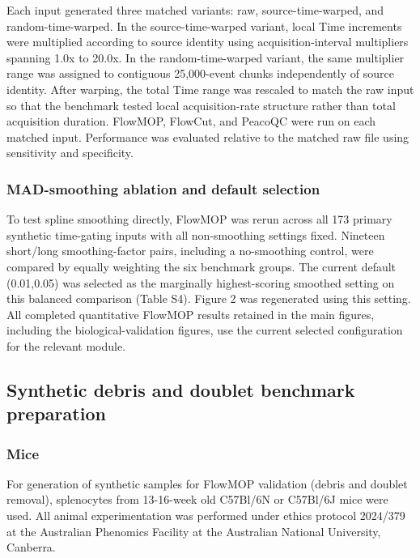 \documentclass[ASNA]{latex/wiley/USG}
\begin{document}
Each input generated three matched variants: raw, source-time-warped,
and random-time-warped. In the source-time-warped variant, local Time
increments were multiplied according to source identity using
acquisition-interval multipliers spanning 1.0x to 20.0x. In the
random-time-warped variant, the same multiplier range was assigned to
contiguous 25,000-event chunks independently of source identity. After
warping, the total Time range was rescaled to match the raw input so
that the benchmark tested local acquisition-rate structure rather than
total acquisition duration. FlowMOP, FlowCut, and PeacoQC were run on
each matched input. Performance was evaluated relative to the matched
raw file using sensitivity and specificity.

\subsubsection{MAD-smoothing ablation and default
selection}\label{mad-smoothing-ablation-and-default-selection}

To test spline smoothing directly, FlowMOP was rerun across all 173
primary synthetic time-gating inputs with all non-smoothing settings
fixed. Nineteen short/long smoothing-factor pairs, including a
no-smoothing control, were compared by equally weighting the six
benchmark groups. The current default (0.01,0.05) was selected as the
marginally highest-scoring smoothed setting on this balanced comparison
(Table S4). Figure 2 was regenerated using this setting. All completed
quantitative FlowMOP results retained in the main figures, including the
biological-validation figures, use the current selected configuration
for the relevant module.

\subsection{Synthetic debris and doublet benchmark
preparation}\label{synthetic-debris-and-doublet-benchmark-preparation}

\subsubsection{Mice}\label{mice}

For generation of synthetic samples for FlowMOP validation (debris and
doublet removal), splenocytes from 13-16-week old C57Bl/6N or C57Bl/6J
mice were used. All animal experimentation was performed under ethics
protocol 2024/379 at the Australian Phenomics Facility at the Australian
National University, Canberra.
\end{document}
